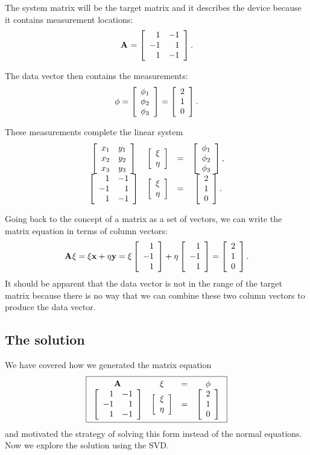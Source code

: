 The system matrix will be the target matrix and it describes the device because it contains measurement locations:
\begin{equation}
  \A{} = \Aexample.
\label{eq:simple:IamA}
\end{equation}

The data vector then contains the measurements:
\begin{equation}
  \phi = \mat{c}{\phi_{1} \\\phi_{2} \\ \phi_{3}} = \mat{c}{2 \\ 1 \\ 0}.
  \label{eq:phi}
\end{equation}

These measurements complete the linear system
\begin{equation}
\begin{array}{cccc}
    \mat{cc}
    {
    x_{1} & y_{1} \\
    x_{2} & y_{2} \\
    x_{3} & y_{3} \\
    }
    &\mat{c}{\xi\\ \eta}
    &=
    &\mat{c}
    {
    \phi_{1} \\
    \phi_{2} \\
    \phi_{3}
    }, \\
    \Aexample
    &\mat{c}{\xi\\ \eta}
    & =
    &\phivector.
\end{array}
\end{equation}

Going back to the concept of a matrix as a set of vectors, we can write the matrix equation in terms of column vectors:
\begin{equation}
  \A{} \xi = \xi \textbf{x} + \eta \textbf{y} = \xi \mat{r}{1\\-1\\1} + \eta \mat{r}{1\\-1\\1} = \mat{c}{2 \\ 1 \\ 0}.
\end{equation}
It should be apparent that the data vector is not in the range of the target matrix because there is no way that we can combine these two column vectors to produce the data vector.
\subsection{The solution}
We have covered how we generated the matrix equation
\begin{equation*}
\boxed{
\begin{array}{cccc}
    \A{} & \xi &=& \phi\\
    \Aexample
    & \mat{c}{\xi\\ \eta}
    & =
    &\phivector
    \label{eq:2:problem}
\end{array}
    }
\end{equation*}
and motivated the strategy of solving this form instead of the normal equations. Now we explore the solution using the SVD.

